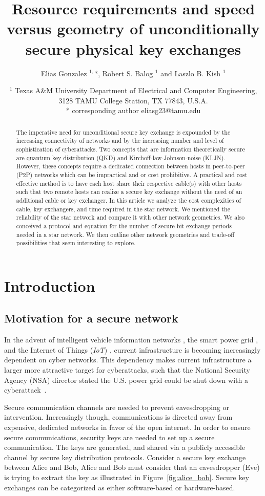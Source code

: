 \documentclass[a4paper,12pt,pdftex]{article}
\title{Resource requirements and speed versus geometry of unconditionally secure physical key exchanges}
\author{Elias Gonzalez $^{1,}$*, Robert S. Balog $^{1}$ and Laszlo B. Kish $^{1}$ }
\date{$^{1}$ Texas A\&M University Department of Electrical and Computer Engineering, 3128 TAMU College Station, TX 77843, U.S.A. \\ * corresponding author eliasg23@tamu.edu}
\begin{document}
\maketitle


\begin{abstract}
The imperative need for unconditional secure key exchange is expounded by the increasing connectivity of networks and by the increasing number and level of sophistication of cyberattacks. Two concepts that are information theoretically secure are quantum key distribution (QKD) and Kirchoff-law-Johnson-noise (KLJN). However, these concepts require a dedicated connection between hosts in peer-to-peer (P2P) networks which can be impractical and or cost prohibitive. A practical and cost effective method is to have each host share their respective cable(s) with other hosts such that two remote hosts can realize a secure key exchange without the need of an additional cable or key exchanger. In this article we analyze the cost complexities of cable, key exchangers, and time required in the star network. We mentioned the reliability of the star network and compare it with other network geometries. We also conceived a protocol and equation for the number of secure bit exchange periods needed in a star network. We then outline other network geometries and trade-off possibilities that seem interesting to explore.
\end{abstract}


\section{Introduction}

\subsection{Motivation for a secure network}

In the advent of intelligent vehicle information networks \cite{evs}, the smart power grid \cite{powergrid}, and the Internet of Things (\textit{IoT}) \cite{iot}, current infrastructure is becoming increasingly dependent on cyber networks. This dependency makes current infrastructure a larger more attractive target for cyberattacks, such that the National Security Agency (NSA) director stated the U.S. power grid could be shut down with a cyberattack~\cite{nsa_china}. 

Secure communication channels are needed to prevent eavesdropping or intervention. Increasingly though, communications is directed away from expensive, dedicated networks in favor of the open internet. In order to ensure secure communications, security keys are needed to set up a secure communication.  The keys are generated, and shared via a publicly accessible channel by secure key distribution protocols. Consider a secure key exchange between Alice and Bob, Alice and Bob must consider that an eavesdropper (Eve) is trying to extract the key as illustrated in Figure~\ref{fig:alice_bob}. Secure key exchanges can be categorized as either software-based or hardware-based.
\end{document}
